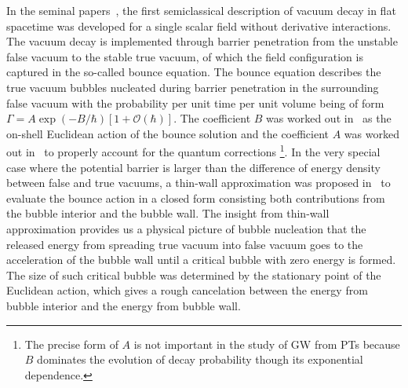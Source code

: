 \documentclass[a4paper,11pt]{article}
\begin{document}
In the seminal papers~\cite{Coleman:1977py,Callan:1977pt}, the first semiclassical description of vacuum decay in flat spacetime was developed for a single scalar field without derivative interactions. The vacuum decay is implemented through barrier penetration from the unstable false vacuum to the stable true vacuum, of which the field configuration is captured in the so-called bounce equation. The bounce equation describes the true vacuum bubbles nucleated during barrier penetration in the surrounding false vacuum with the probability per unit time per unit volume being of form $\Gamma=A\exp(-B/\hbar)[1+\mathcal{O}(\hbar)]$. The coefficient $B$ was worked out in~\cite{Coleman:1977py} as the on-shell Euclidean  action  of the bounce solution and the coefficient $A$ was worked out in~\cite{Callan:1977pt} to properly account for the quantum corrections \footnote{The precise form of $A$ is not important in the study of GW from PTs because $B$ dominates the evolution of decay probability though its exponential dependence.}. In the very special case where the potential barrier is larger than the difference of energy density between false and true vacuums, a thin-wall approximation was proposed in~\cite{Coleman:1977py} to evaluate the bounce action in a closed form consisting both contributions from the bubble interior and the bubble wall. The insight from thin-wall approximation provides us a physical picture of bubble nucleation that the released energy from spreading true vacuum into false vacuum goes to the acceleration of the bubble wall until a critical bubble with zero energy is formed. The size of such critical bubble was determined by the stationary point of the Euclidean action, which gives a rough cancelation between the energy from bubble interior and the energy from bubble wall.
\end{document}
